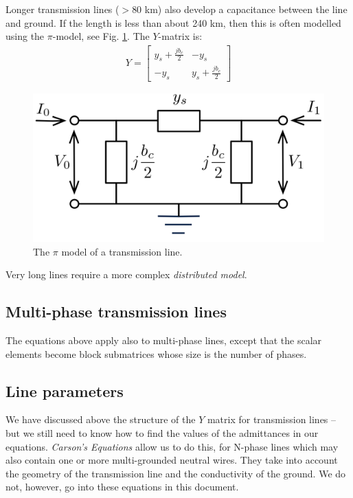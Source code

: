 \documentclass[11pt]{article}
\begin{document}
Longer transmission lines ($> 80$ km) also develop a capacitance between the line and ground. If the length is less than about 240 km, then this is often modelled using the $\pi$-model, see Fig. \ref{FIG_PI_LINE}. The $Y$-matrix is:
\begin{align}
	Y = \begin{bmatrix}y_s + \frac{j b_c}{2} & -y_s \\ -y_s & y_s + \frac{j b_c}{2} \end{bmatrix}
\end{align}
\begin{figure}[!h]
	\begin{center}
		\includegraphics[width=(5cm)]{pi_line}
	\end{center}
	\caption{
		The $\pi$ model of a transmission line.
	}
	\label{FIG_PI_LINE}
\end{figure}
Very long lines require a more complex \emph{distributed model}.

\subsection{Multi-phase transmission lines}
The equations above apply also to multi-phase lines, except that the scalar elements become block submatrices whose size is the number of phases.

\subsection{Line parameters}
We have discussed above the structure of the $Y$ matrix for transmission lines -- but we still need to know how to find the values of the admittances in our equations. \emph{Carson's Equations} allow us to do this, for N-phase lines which may also contain one or more multi-grounded neutral wires. They take into account the geometry of the transmission line and the conductivity of the ground. We do not, however, go into these equations in this document.
\end{document}
